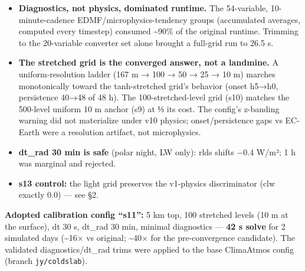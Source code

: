 \documentclass[11pt]{article}
\providecommand{\tightlist}{%
      \setlength{\itemsep}{0pt}\setlength{\parskip}{0pt}}
\begin{document}
\begin{itemize}
\tightlist
\item
  \textbf{Diagnostics, not physics, dominated runtime.} The 54-variable,
  10-minute-cadence EDMF/microphysics-tendency groups (accumulated
  averages, computed every timestep) consumed \textasciitilde90\% of the
  original runtime. Trimming to the 20-variable converter set alone
  brought a full-grid run to 26.5 s.
\item
  \textbf{The stretched grid is the converged answer, not a landmine.} A
  uniform-resolution ladder (167 m → 100 → 50 → 25 → 10 m) marches
  monotonically toward the tanh-stretched grid's behavior (onset h5→h0,
  persistence 40→48 of 48 h). The 100-stretched-level grid (s10) matches
  the 500-level uniform 10 m anchor (s9) at ⅓ its cost. The config's
  z-banding warning did not materialize under v10 physics;
  onset/persistence gaps vs EC-Earth were a resolution artifact, not
  microphysics.
\item
  \textbf{dt\_rad 30 min is safe} (polar night, LW only): rlds shifts
  −0.4 W/m²; 1 h was marginal and rejected.
\item
  \textbf{s13 control:} the light grid preserves the v1-physics
  discriminator (clw exactly 0.0) --- see §2.
\end{itemize}

\textbf{Adopted calibration config ``s11'':} 5 km top, 100 stretched
levels (10 m at the surface), dt 30 s, dt\_rad 30 min, minimal
diagnostics --- \textbf{42 s solve} for 2 simulated days
(\textasciitilde16× vs original; \textasciitilde40× for the
pre-convergence candidate). The validated diagnostics/dt\_rad trims were
applied to the base ClimaAtmos config (branch \texttt{jy/coldslab}).
\end{document}
